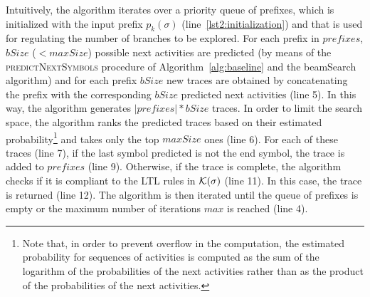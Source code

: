 Intuitively, the algorithm iterates over a priority queue of prefixes, which is initialized with the input prefix $p_k(\sigma)$ (line~\ref{lst2:initialization}) and that is used for regulating the number of branches to be explored. For each prefix in $prefixes$, $bSize$ ($< maxSize$) possible next activities are predicted (by means of the \textsc{predictNextSymbols} procedure of Algorithm~\ref{alg:baseline} and the beamSearch algorithm) and for each prefix $bSize$ new traces are obtained by concatenating the prefix with the corresponding $bSize$ predicted next activities (line 5). In this way, the algorithm generates $\left|prefixes\right|*bSize$ traces. In order to limit the search space, the algorithm ranks the predicted traces based on their estimated probability\footnote{Note that, in order to prevent overflow in the computation, the estimated probability for sequences of activities is computed as the sum of the logarithm of the probabilities of the next activities rather than as the product of the probabilities of the next activities.} and takes only the top $maxSize$ ones (line 6). For each of these traces (line 7), if the last symbol predicted is not the end symbol, the trace is added to $prefixes$ (line 9). Otherwise, if the trace is complete, the algorithm checks if it is compliant to the LTL rules in $\cal{K}(\sigma)$ (line 11). In this case, the trace is returned (line 12).
The algorithm is then iterated until the queue of prefixes is empty or the maximum number of iterations $max$ is reached (line 4).




